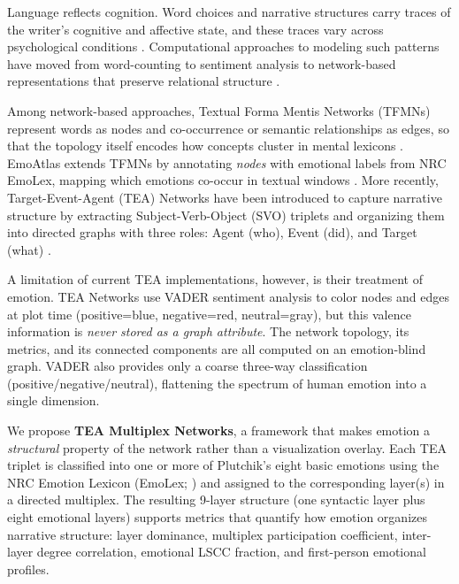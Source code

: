 \documentclass[11pt,a4paper]{article}
\begin{document}
Language reflects cognition.  Word choices and narrative structures carry traces of the writer's cognitive and affective state, and these traces vary across psychological conditions \citep{pennebaker2003}.  Computational approaches to modeling such patterns have moved from word-counting \citep[LIWC;][]{pennebaker2015liwc} to sentiment analysis \citep[VADER;][]{hutto2014vader} to network-based representations that preserve relational structure \citep{stella2020formamentis}.

Among network-based approaches, Textual Forma Mentis Networks (TFMNs) represent words as nodes and co-occurrence or semantic relationships as edges, so that the topology itself encodes how concepts cluster in mental lexicons \citep{stella2020formamentis}.  EmoAtlas extends TFMNs by annotating \textit{nodes} with emotional labels from NRC EmoLex, mapping which emotions co-occur in textual windows \citep{stella2022emoatlas}.  More recently, Target-Event-Agent (TEA) Networks have been introduced to capture narrative structure by extracting Subject-Verb-Object (SVO) triplets and organizing them into directed graphs with three roles: Agent (who), Event (did), and Target (what) \citep{franchini2026tea}.

A limitation of current TEA implementations, however, is their treatment of emotion.  TEA Networks use VADER sentiment analysis to color nodes and edges at plot time (positive=blue, negative=red, neutral=gray), but this valence information is \textit{never stored as a graph attribute}.  The network topology, its metrics, and its connected components are all computed on an emotion-blind graph.  VADER also provides only a coarse three-way classification (positive/negative/neutral), flattening the spectrum of human emotion into a single dimension.

We propose \textbf{TEA Multiplex Networks}, a framework that makes emotion a \textit{structural} property of the network rather than a visualization overlay.  Each TEA triplet is classified into one or more of Plutchik's eight basic emotions \citep{plutchik1980} using the NRC Emotion Lexicon (EmoLex; \citealt{mohammad2013nrc}) and assigned to the corresponding layer(s) in a directed multiplex.  The resulting 9-layer structure (one syntactic layer plus eight emotional layers) supports metrics that quantify how emotion organizes narrative structure: layer dominance, multiplex participation coefficient, inter-layer degree correlation, emotional LSCC fraction, and first-person emotional profiles.
\end{document}
